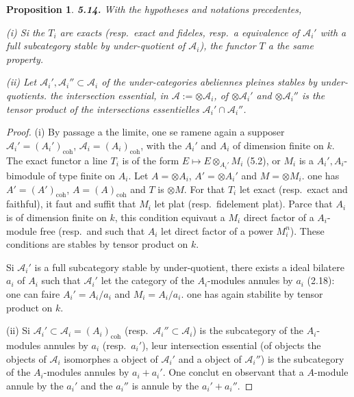 \documentclass[12pt,a4paper]{article}
\theoremstyle{plain}
\newtheorem{proposition}[theorem]{Proposition}
\theoremstyle{definition}
\theoremstyle{remark}
\begin{document}
\begin{proposition}\label{prop:5.14}
\textbf{5.14.} With the hypotheses and notations precedentes,

(i) Si the $T_i$ are exacts (resp.~exact and fideles, resp.~a equivalence of $\mathcal{A}_i'$ with a full subcategory stable by under-quotient of $\mathcal{A}_i$), the functor $T$ a the same property.

(ii) Let $\mathcal{A}_i', \mathcal{A}_i'' \subset \mathcal{A}_i$ of the under-categories abeliennes pleines stables by under-quotients. the intersection essential, in $\mathcal{A} := \otimes \mathcal{A}_i$, of $\otimes \mathcal{A}_i'$ and $\otimes \mathcal{A}_i''$ is the tensor product of the intersections essentielles $\mathcal{A}_i' \cap \mathcal{A}_i''$.
\end{proposition}

\begin{proof}
(i) By passage a the limite, one se ramene again a supposer $\mathcal{A}_i' = (A_i')_\mathrm{coh}$, $\mathcal{A}_i = (A_i)_\mathrm{coh}$, with the $A_i'$ and $A_i$ of dimension finite on $k$. The exact functor a line $T_i$ is of the form $E \mapsto E \otimes_{A_i'} M_i$ (5.2), or $M_i$ is a $A_i', A_i$-bimodule of type finite on $A_i$. Let $A = \otimes A_i$, $A' = \otimes A_i'$ and $M = \otimes M_i$. one has $A' = (A')_\mathrm{coh}$, $A = (A)_\mathrm{coh}$ and $T$ is $\otimes M$. For that $T_i$ let exact (resp.~exact and faithful), it faut and suffit that $M_i$ let plat (resp.~fidelement plat). Parce that $A_i$ is of dimension finite on $k$, this condition equivaut a $M_i$ direct factor of a $A_i$-module free (resp.~and such that $A_i$ let direct factor of a power $M_i^n$). These conditions are stables by tensor product on $k$.

Si $\mathcal{A}_i'$ is a full subcategory stable by under-quotient, there exists a ideal bilatere $a_i$ of $A_i$ such that $\mathcal{A}_i'$ let the category of the $A_i$-modules annules by $a_i$ (2.18): one can faire $A_i' = A_i/a_i$ and $M_i = A_i/a_i$. one has again stabilite by tensor product on $k$.

(ii) Si $\mathcal{A}_i' \subset \mathcal{A}_i = (A_i)_\mathrm{coh}$ (resp.~$\mathcal{A}_i'' \subset \mathcal{A}_i$) is the subcategory of the $A_i$-modules annules by $a_i$ (resp.~$a_i'$), leur intersection essential (of objects the objects of $\mathcal{A}_i$ isomorphes a object of $\mathcal{A}_i'$ and a object of $\mathcal{A}_i''$) is the subcategory of the $A_i$-modules annules by $a_i + a_i'$. One conclut en observant that a $A$-module annule by the $a_i'$ and the $a_i''$ is annule by the $a_i' + a_i''$.
\end{proof}
\end{document}

